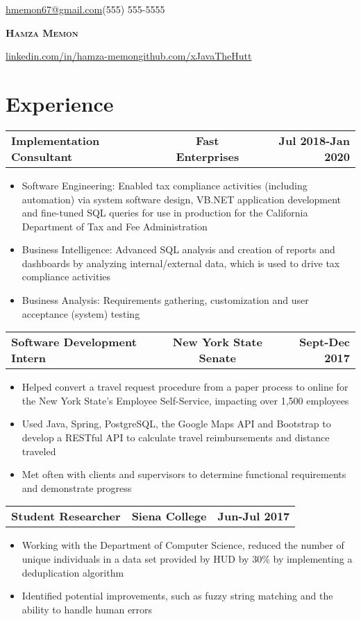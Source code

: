 \documentclass[letterpaper,11pt]{article}
\makeatletter
\newcommand{\resumeItem}[1]{
  \item\small{#1}
  \vspace{-2pt}
}
\newcommand{\resumeSubheading}[3]{
  \begin{tabular*}{\textwidth}{l@{\extracolsep{\fill}}c@{\extracolsep{\fill}}r}
    \textbf{#1} & \textbf{#2} & \textbf{#3}
  \end{tabular*}
  \vspace{-17pt}
}
\newcommand{\resumeItemListStart}{\begin{itemize}}
\newcommand{\resumeItemListEnd}{\end{itemize}\vspace{-5pt}}
\newcommand\name{Hamza Memon}
\newcommand\printname{
  \typeout {kokoko}
  \typeout \spaceskip
  \textbf{\LARGE{\textsc{\name}}}
}
\newcommand\email{hmemon67@gmail.com}
\makeatother
\begin{document}
\begin{minipage}[b]{0.33333\textwidth}
  \raggedright
  \href{mailto:{\email}}{\email}\linebreak(555) 555-5555
\end{minipage}%
\begin{minipage}[b]{0.33333\textwidth}
  \centering
  \printname
\end{minipage}%
\begin{minipage}[b]{0.33333\textwidth}
  \raggedleft
  \href{http://www.linkedin.com/in/hamza-memon}{linkedin.com/in/hamza-memon}\linebreak\href{http://www.github.com/xJavaTheHutt}{github.com/xJavaTheHutt}
\end{minipage}%


\section{Experience}
  \resumeSubheading{Implementation Consultant}{Fast Enterprises}{Jul 2018-Jan 2020}
    \resumeItemListStart
      \resumeItem{Software Engineering: Enabled tax compliance activities (including automation) via
      system software design, VB.NET application development and fine-tuned SQL queries for use in
    production for the California Department of Tax and Fee Administration}
      \resumeItem{Business Intelligence: Advanced SQL analysis and creation of reports and dashboards by analyzing internal/external data, which is used to drive tax compliance activities}
      \resumeItem{Business Analysis: Requirements gathering, customization and user acceptance (system) testing}
    \resumeItemListEnd
      
  \resumeSubheading{Software Development Intern}{New York State Senate}{Sept-Dec 2017}
    \resumeItemListStart
      \resumeItem{Helped convert a travel request procedure from a paper process to online for the New York State's Employee Self-Service, impacting over 1,500 employees}
      \resumeItem{Used Java, Spring, PostgreSQL, the Google Maps API and Bootstrap to develop a RESTful API to calculate travel reimbursements and distance traveled}
      \resumeItem{Met often with clients and supervisors to determine functional requirements and demonstrate progress}
    \resumeItemListEnd

  \resumeSubheading{Student Researcher}{Siena College}{Jun-Jul 2017}
    \resumeItemListStart
      \resumeItem{Working with the Department of Computer Science, reduced the number of unique individuals in a data set provided by HUD by 30\% by implementing a deduplication algorithm}
      \resumeItem{Identified potential improvements, such as fuzzy string matching and the ability to handle human errors}
    \resumeItemListEnd
\end{document}
